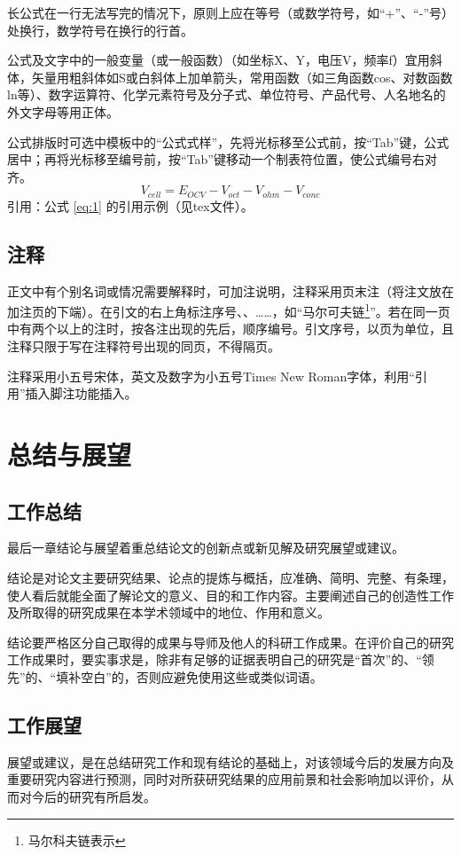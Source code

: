 \documentclass{jitthesis-2026}
\begin{document}
长公式在一行无法写完的情况下，原则上应在等号（或数学符号，如“+”、“-”号）处换行，数学符号在换行的行首。

公式及文字中的一般变量（或一般函数）（如坐标X、Y，电压V，频率f）宜用斜体，矢量用粗斜体如S或白斜体上加单箭头，常用函数（如三角函数cos、对数函数ln等）、数字运算符、化学元素符号及分子式、单位符号、产品代号、人名地名的外文字母等用正体。

公式排版时可选中模板中的“公式式样”，先将光标移至公式前，按“Tab”键，公式居中；再将光标移至编号前，按“Tab”键移动一个制表符位置，使公式编号右对齐。
\begin{equation}\label{eq:1}
  V_{cell}=E_{OCV}-V_{oct}-V_{ohm}-V_{conc}
  \end{equation}
引用：公式 \eqref{eq:1} 的引用示例（见tex文件）。

  
\section{注释}
正文中有个别名词或情况需要解释时，可加注说明，注释采用页末注（将注文放在加注页的下端）。在引文的右上角标注序号、、……，如“马尔可夫链\footnote{马尔科夫链表示}”。若在同一页中有两个以上的注时，按各注出现的先后，顺序编号。引文序号，以页为单位，且注释只限于写在注释符号出现的同页，不得隔页。

注释采用小五号宋体，英文及数字为小五号Times New Roman字体，利用“引用”插入脚注功能插入。

\chapter{总结与展望}
\section{工作总结}
最后一章结论与展望着重总结论文的创新点或新见解及研究展望或建议。

结论是对论文主要研究结果、论点的提炼与概括，应准确、简明、完整、有条理，使人看后就能全面了解论文的意义、目的和工作内容。主要阐述自己的创造性工作及所取得的研究成果在本学术领域中的地位、作用和意义。

结论要严格区分自己取得的成果与导师及他人的科研工作成果。在评价自己的研究工作成果时，要实事求是，除非有足够的证据表明自己的研究是“首次”的、“领先”的、“填补空白”的，否则应避免使用这些或类似词语。

\section{工作展望}
展望或建议，是在总结研究工作和现有结论的基础上，对该领域今后的发展方向及重要研究内容进行预测，同时对所获研究结果的应用前景和社会影响加以评价，从而对今后的研究有所启发。
\end{document}
